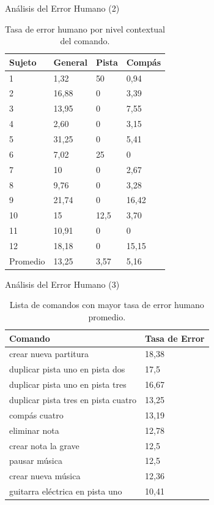 \begin{frame}{An\'alisis del Error Humano (2)}
\begin{table}[H]
\centering
\footnotesize
\begin{tabular}{|p{1.6cm}|p{1.6cm}|p{1.6cm}|p{1.6cm}|}
\hline
    Sujeto & General & Pista & Comp\'as \\
    \hline
1 & 1,32  & 50     & 0,94 \\
2 & 16,88 & 0      & 3,39 \\
3 & 13,95 & 0      & 7,55 \\
4 & 2,60 & 0      & 3,15 \\
5 & 31,25 & 0      & 5,41 \\
6 & 7,02 & 25     & 0 \\
7 & 10     & 0      & 2,67 \\
8 & 9,76 & 0      & 3,28 \\
9 & 21,74 & 0      & 16,42 \\
10 & 15     & 12,5 & 3,70 \\
11 & 10,91 & 0      & 0 \\
12 & 18,18 & 0      & 15,15 \\
\hline
Promedio & 13,25 & 3,57 & 5,16 \\
\hline
\end{tabular}
\caption{Tasa de error humano por nivel contextual del comando.}
\label{sec:error-contexto}
\end{table}

\end{frame}

\begin{frame}{An\'alisis del Error Humano (3)}
\begin{table}[H]
\centering
\footnotesize
\begin{tabular}{|l|p{3cm}|}
\hline
Comando & Tasa de Error \\
\hline
crear nueva partitura & 18,38 \\
duplicar pista uno en pista dos & 17,5 \\
duplicar pista uno en pista tres & 16,67 \\
duplicar pista tres en pista cuatro & 13,25 \\
comp\'as cuatro & 13,19 \\
eliminar nota & 12,78 \\
crear nota la grave & 12,5 \\
pausar m\'usica & 12,5 \\
crear nueva m\'usica & 12,36 \\
guitarra el\'ectrica en pista uno & 10,41 \\
\hline
\end{tabular}
\caption{Lista de comandos con mayor tasa de error humano promedio.}
\label{sec:tabla-lista-comandos-error}
\end{table}

\end{frame}

